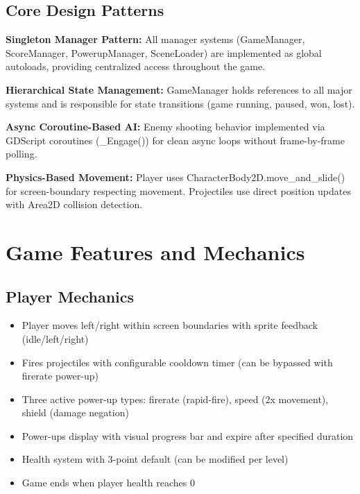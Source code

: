 \documentclass{article}
\begin{document}
\subsection{Core Design Patterns}

\textbf{Singleton Manager Pattern:}
All manager systems (GameManager, ScoreManager, PowerupManager, SceneLoader) are implemented as global autoloads, providing centralized access throughout the game.

\textbf{Hierarchical State Management:}
GameManager holds references to all major systems and is responsible for state transitions (game running, paused, won, lost).

\textbf{Async Coroutine-Based AI:}
Enemy shooting behavior implemented via GDScript coroutines (\_Engage()) for clean async loops without frame-by-frame polling.

\textbf{Physics-Based Movement:}
Player uses CharacterBody2D.move\_and\_slide() for screen-boundary respecting movement. Projectiles use direct position updates with Area2D collision detection.

\section{Game Features and Mechanics}

\subsection{Player Mechanics}
\begin{itemize}
    \item Player moves left/right within screen boundaries with sprite feedback (idle/left/right)
    \item Fires projectiles with configurable cooldown timer (can be bypassed with firerate power-up)
    \item Three active power-up types: firerate (rapid-fire), speed (2x movement), shield (damage negation)
    \item Power-ups display with visual progress bar and expire after specified duration
    \item Health system with 3-point default (can be modified per level)
    \item Game ends when player health reaches 0
\end{itemize}
\end{document}
